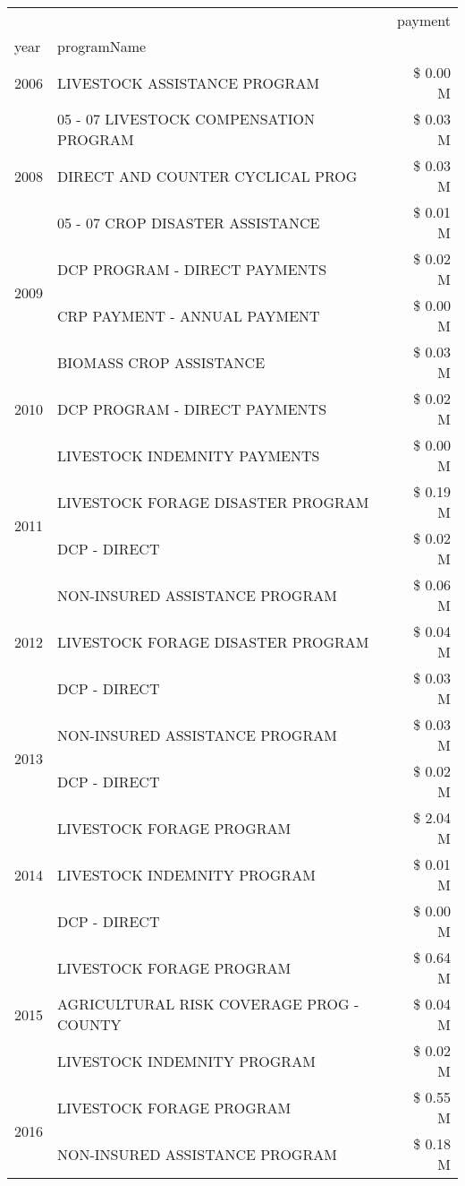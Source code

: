 \begin{tabular}{llr}
\toprule
 &  & payment \\
year & programName &  \\
\midrule
2006 & LIVESTOCK ASSISTANCE PROGRAM & \$ 0.00 M \\
\cline{1-3}
\multirow[t]{3}{*}{2008} & 05 - 07 LIVESTOCK COMPENSATION PROGRAM & \$ 0.03 M \\
 & DIRECT AND COUNTER CYCLICAL PROG & \$ 0.03 M \\
 & 05 - 07 CROP DISASTER ASSISTANCE & \$ 0.01 M \\
\cline{1-3}
\multirow[t]{2}{*}{2009} & DCP PROGRAM - DIRECT PAYMENTS & \$ 0.02 M \\
 & CRP PAYMENT - ANNUAL PAYMENT & \$ 0.00 M \\
\cline{1-3}
\multirow[t]{3}{*}{2010} & BIOMASS CROP ASSISTANCE & \$ 0.03 M \\
 & DCP PROGRAM - DIRECT PAYMENTS & \$ 0.02 M \\
 & LIVESTOCK INDEMNITY PAYMENTS & \$ 0.00 M \\
\cline{1-3}
\multirow[t]{2}{*}{2011} & LIVESTOCK FORAGE DISASTER PROGRAM & \$ 0.19 M \\
 & DCP - DIRECT & \$ 0.02 M \\
\cline{1-3}
\multirow[t]{3}{*}{2012} & NON-INSURED ASSISTANCE PROGRAM & \$ 0.06 M \\
 & LIVESTOCK FORAGE DISASTER PROGRAM & \$ 0.04 M \\
 & DCP - DIRECT & \$ 0.03 M \\
\cline{1-3}
\multirow[t]{2}{*}{2013} & NON-INSURED ASSISTANCE PROGRAM & \$ 0.03 M \\
 & DCP - DIRECT & \$ 0.02 M \\
\cline{1-3}
\multirow[t]{3}{*}{2014} & LIVESTOCK FORAGE PROGRAM & \$ 2.04 M \\
 & LIVESTOCK INDEMNITY PROGRAM & \$ 0.01 M \\
 & DCP - DIRECT & \$ 0.00 M \\
\cline{1-3}
\multirow[t]{3}{*}{2015} & LIVESTOCK FORAGE PROGRAM & \$ 0.64 M \\
 & AGRICULTURAL RISK COVERAGE PROG - COUNTY & \$ 0.04 M \\
 & LIVESTOCK INDEMNITY PROGRAM & \$ 0.02 M \\
\cline{1-3}
\multirow[t]{3}{*}{2016} & LIVESTOCK FORAGE PROGRAM                      & \$ 0.55 M \\
 & NON-INSURED ASSISTANCE PROGRAM                & \$ 0.18 M \\

\end{tabular}
